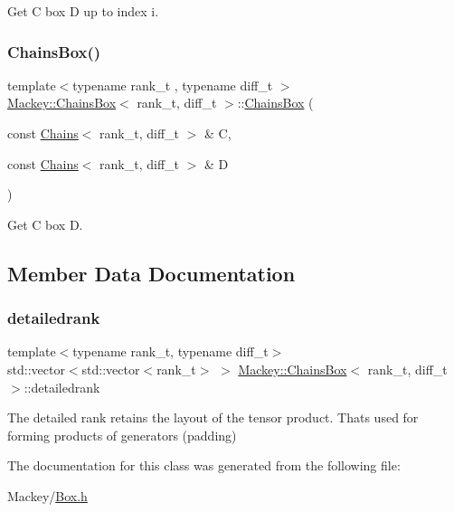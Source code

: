 Get C box D up to index i. 

\mbox{\label{classMackey_1_1ChainsBox_a6e001d0c3284bc1abf6d101bc76ad109}} 
\subsubsection{\texorpdfstring{Chains\+Box()}{ChainsBox()}\hspace{0.1cm}{\footnotesize\ttfamily [4/4]}}
{\footnotesize\ttfamily template$<$typename rank\+\_\+t , typename diff\+\_\+t $>$ \\
\hyperlink{classMackey_1_1ChainsBox}{Mackey\+::\+Chains\+Box}$<$ rank\+\_\+t, diff\+\_\+t $>$\+::\hyperlink{classMackey_1_1ChainsBox}{Chains\+Box} (\begin{DoxyParamCaption}\item[{const \hyperlink{classMackey_1_1Chains}{Chains}$<$ rank\+\_\+t, diff\+\_\+t $>$ \&}]{C,  }\item[{const \hyperlink{classMackey_1_1Chains}{Chains}$<$ rank\+\_\+t, diff\+\_\+t $>$ \&}]{D }\end{DoxyParamCaption})}



Get C box D. 



\subsection{Member Data Documentation}
\mbox{\label{classMackey_1_1ChainsBox_a565be64db2cd9c573edd4866dbd8d1d6}} 
\subsubsection{\texorpdfstring{detailedrank}{detailedrank}}
{\footnotesize\ttfamily template$<$typename rank\+\_\+t, typename diff\+\_\+t$>$ \\
std\+::vector$<$std\+::vector$<$rank\+\_\+t$>$ $>$ \hyperlink{classMackey_1_1ChainsBox}{Mackey\+::\+Chains\+Box}$<$ rank\+\_\+t, diff\+\_\+t $>$\+::detailedrank}



The detailed rank retains the layout of the tensor product. That\textquotesingle{}s used for forming products of generators (padding) 



The documentation for this class was generated from the following file\+:\begin{DoxyCompactItemize}
\item 
Mackey/\hyperlink{Box_8h}{Box.\+h}\end{DoxyCompactItemize}
